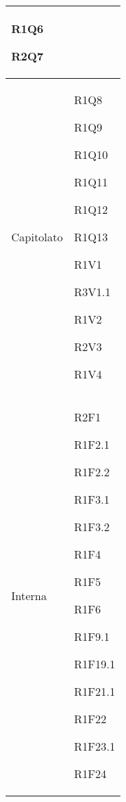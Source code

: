 \begin{center}
\begin{longtable}{|p{44mm}|p{22mm}|}
R1Q6 \newline

R2Q7 \newline
\\
\hline
Capitolato &

R1Q8 \newline

R1Q9 \newline

R1Q10 \newline

R1Q11 \newline

R1Q12 \newline

R1Q13 \newline

R1V1 \newline

R3V1.1 \newline

R1V2 \newline

R2V3 \newline

R1V4 \newline
\\
\hline
Interna &
R2F1 \newline

R1F2.1 \newline

R1F2.2 \newline

R1F3.1 \newline

R1F3.2 \newline

R1F4 \newline

R1F5 \newline

R1F6 \newline

R1F9.1 \newline

R1F19.1 \newline

R1F21.1 \newline

R1F22 \newline

R1F23.1 \newline

R1F24 \newline


\end{longtable}
\end{center}
